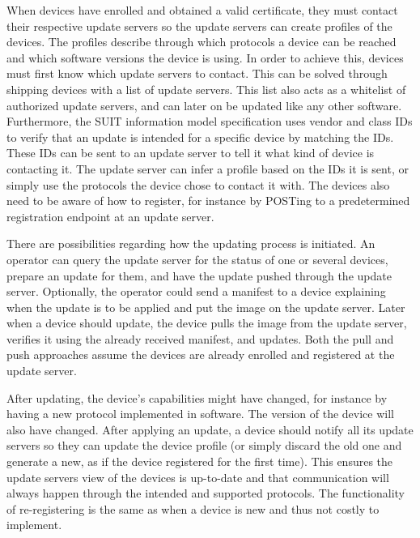\documentclass[0-thesis.tex]{subfiles}
\begin{document}
When devices have enrolled and obtained a valid certificate, they must contact their
respective update servers so the update servers can create profiles of the devices. The
profiles describe through which protocols a device can be reached and which software
versions the device is using. In order to achieve this, devices must first know which
update servers to contact. This can be solved through shipping devices with a list of
update servers. This list also acts as a whitelist of authorized update servers, and can
later on be updated like any other software. Furthermore, the SUIT information model
specification uses vendor and class IDs to verify that an update is intended for a
specific device by matching the IDs. These IDs can be sent to an update server to tell it
what kind of device is contacting it. The update server can infer a profile based on the
IDs it is sent, or simply use the protocols the device chose to contact it with. The
devices also need to be aware of how to register, for instance by POSTing to a
predetermined registration endpoint at an update server. 

There are possibilities regarding how the updating process is initiated. An operator can
query the update server for the status of one or several devices, prepare an update for
them, and have the update pushed through the update server. Optionally, the operator could
send a manifest to a device explaining when the update is to be applied and put the image
on the update server. Later when a device should update, the device pulls the image from
the update server, verifies it using the already received manifest, and updates. Both the
pull and push approaches assume the devices are already enrolled and registered at the
update server.

After updating, the device's capabilities might have changed, for instance by having a new
protocol implemented in software. The version of the device will also have changed. After
applying an update, a device should notify all its update servers so they can update the
device profile (or simply discard the old one and generate a new, as if the device
registered for the first time). This ensures the update servers view of the devices is
up-to-date and that communication will always happen through the intended and supported
protocols. The functionality of re-registering is the same as when a device is new and
thus not costly to implement.
\end{document}
